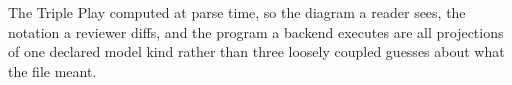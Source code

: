 \documentclass[
  ignorenonframetext,
]{beamer}
\begin{document}
\begin{frame}{The Triple Play}
computed at parse time, so the diagram a reader sees, the notation a
reviewer diffs, and the program a backend executes are all projections
of one declared model kind rather than three loosely coupled guesses
about what the file meant.
\end{frame}
\end{document}
